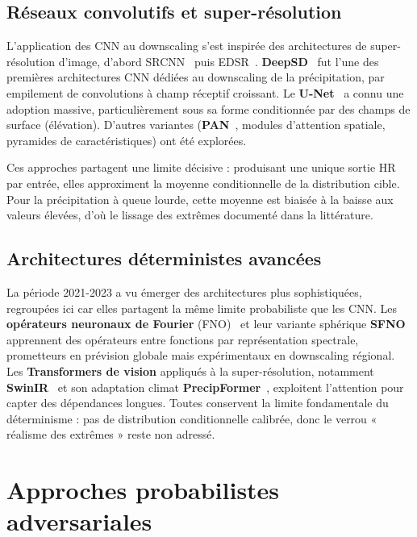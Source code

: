 \documentclass[14pt,a4paper,openany]{extreport}
\theoremstyle{definition}
\begin{document}
\subsection{Réseaux convolutifs et super-résolution}
\label{ssec:soa-cnn}

L'application des CNN au downscaling s'est inspirée des architectures de super-résolution d'image, d'abord SRCNN~\cite{dong_srcnn_2014} puis EDSR~\cite{lim_edsr_2017}. \textbf{DeepSD}~\cite{vandal_deepsd_2017} fut l'une des premières architectures CNN dédiées au downscaling de la précipitation, par empilement de convolutions à champ réceptif croissant. Le \textbf{U-Net}~\cite{ronneberger_unet_2015} a connu une adoption massive, particulièrement sous sa forme conditionnée par des champs de surface (élévation). D'autres variantes (\textbf{PAN}~\cite{pan_pan_2019}, modules d'attention spatiale, pyramides de caractéristiques) ont été explorées.

Ces approches partagent une limite décisive : produisant une unique sortie HR par entrée, elles approximent la moyenne conditionnelle de la distribution cible. Pour la précipitation à queue lourde, cette moyenne est biaisée à la baisse aux valeurs élevées, d'où le lissage des extrêmes documenté dans la littérature.

\subsection{Architectures déterministes avancées}
\label{ssec:soa-avancees}

La période 2021-2023 a vu émerger des architectures plus sophistiquées, regroupées ici car elles partagent la même limite probabiliste que les CNN. Les \textbf{opérateurs neuronaux de Fourier} (FNO)~\cite{li_fno_2021} et leur variante sphérique \textbf{SFNO}~\cite{bonev_sfno_2023} apprennent des opérateurs entre fonctions par représentation spectrale, prometteurs en prévision globale mais expérimentaux en downscaling régional. Les \textbf{Transformers de vision} appliqués à la super-résolution, notamment \textbf{SwinIR}~\cite{liang_swinir_2021} et son adaptation climat \textbf{PrecipFormer}~\cite{lopezgomez_precipformer_2023}, exploitent l'attention pour capter des dépendances longues. Toutes conservent la limite fondamentale du déterminisme : pas de distribution conditionnelle calibrée, donc le verrou « réalisme des extrêmes » reste non adressé.

\section{Approches probabilistes adversariales}
\label{sec:soa-adv}
\end{document}
